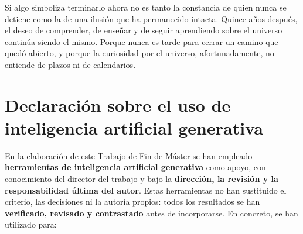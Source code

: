 \documentclass[10pt,a4paper]{report}
\begin{document}
Si algo simboliza terminarlo ahora no es tanto la constancia de quien nunca se detiene como la de una ilusión que ha permanecido intacta. Quince años después, el deseo de comprender, de enseñar y de seguir aprendiendo sobre el universo continúa siendo el mismo. Porque nunca es tarde para cerrar un camino que quedó abierto, y porque la curiosidad por el universo, afortunadamente, no entiende de plazos ni de calendarios.



\newpage
\section*{Declaración sobre el uso de inteligencia artificial generativa}\label{sec:declaracionIA}

En la elaboración de este Trabajo de Fin de Máster se han empleado \textbf{herramientas de inteligencia artificial generativa} como apoyo, con conocimiento del director del trabajo y bajo la \textbf{dirección, la revisión y la responsabilidad última del autor}. Estas herramientas no han sustituido el criterio, las decisiones ni la autoría propios: todos los resultados se han \textbf{verificado, revisado y contrastado} antes de incorporarse. En concreto, se han utilizado para:
\end{document}
